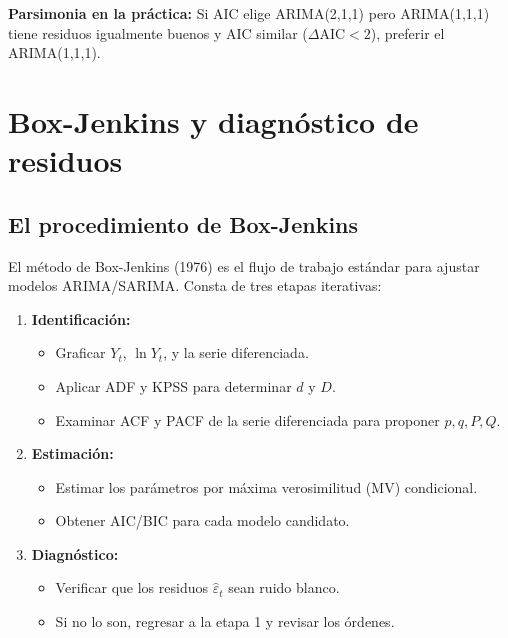 \documentclass[12pt,a4paper]{article}
\theoremstyle{definition}
\begin{document}
\noindent\textbf{Parsimonia en la práctica:} Si AIC elige ARIMA(2,1,1) pero
ARIMA(1,1,1) tiene residuos igualmente buenos y AIC similar ($\Delta \text{AIC} < 2$),
preferir el ARIMA(1,1,1).

\section{Box-Jenkins y diagnóstico de residuos}

\subsection{El procedimiento de Box-Jenkins}

El método de Box-Jenkins (1976) es el flujo de trabajo estándar para ajustar
modelos ARIMA/SARIMA. Consta de tres etapas iterativas:

\begin{enumerate}
  \item \textbf{Identificación:}
    \begin{itemize}[nosep]
      \item Graficar $Y_t$, $\ln Y_t$, y la serie diferenciada.
      \item Aplicar ADF y KPSS para determinar $d$ y $D$.
      \item Examinar ACF y PACF de la serie diferenciada para proponer $p, q, P, Q$.
    \end{itemize}

  \item \textbf{Estimación:}
    \begin{itemize}[nosep]
      \item Estimar los parámetros por máxima verosimilitud (MV) condicional.
      \item Obtener AIC/BIC para cada modelo candidato.
    \end{itemize}

  \item \textbf{Diagnóstico:}
    \begin{itemize}[nosep]
      \item Verificar que los residuos $\hat{\varepsilon}_t$ sean ruido blanco.
      \item Si no lo son, regresar a la etapa 1 y revisar los órdenes.
    \end{itemize}
\end{enumerate}
\end{document}
